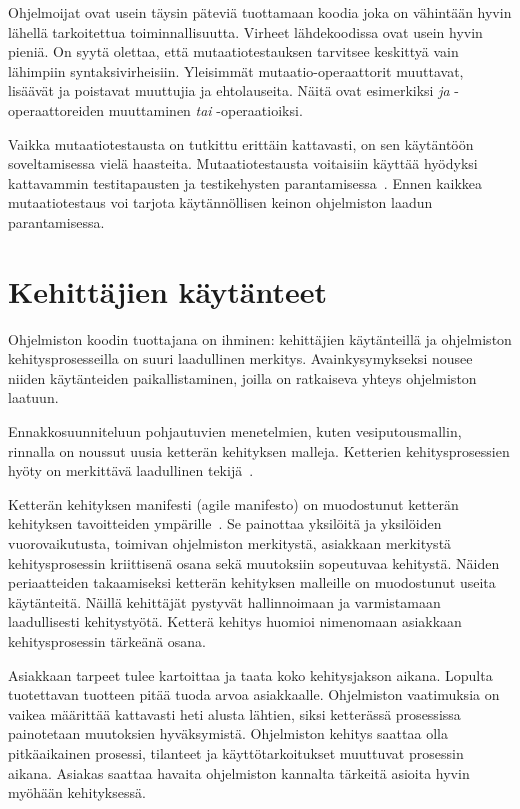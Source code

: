 \documentclass[finnish]{../tktltiki2}
\theoremstyle{definition}
\theoremstyle{remark}
\begin{document}
    Ohjelmoijat ovat usein täysin päteviä tuottamaan koodia joka on vähintään hyvin lähellä tarkoitettua 
toiminnallisuutta. Virheet lähdekoodissa ovat usein hyvin pieniä. On syytä olettaa, että mutaatiotestauksen tarvitsee 
keskittyä vain lähimpiin syntaksivirheisiin. Yleisimmät mutaatio-operaattorit muuttavat, lisäävät ja poistavat muuttujia 
ja ehtolauseita. Näitä ovat esimerkiksi \emph{ja} -operaattoreiden muuttaminen \emph{tai} -operaatioiksi.

Vaikka mutaatiotestausta on tutkittu erittäin kattavasti, on sen käytäntöön soveltamisessa vielä haasteita. 
Mutaatiotestausta voitaisiin käyttää hyödyksi kattavammin testitapausten ja testikehysten parantamisessa~\cite{YH11}. 
Ennen kaikkea mutaatiotestaus voi tarjota käytännöllisen keinon ohjelmiston laadun parantamisessa.

\section{Kehittäjien käytänteet}

Ohjelmiston koodin tuottajana on ihminen: kehittäjien käytänteillä ja ohjelmiston kehitysprosesseilla on suuri 
laadullinen merkitys. Avainkysymykseksi nousee niiden käytänteiden paikallistaminen, joilla on ratkaiseva yhteys 
ohjelmiston laatuun.

    Ennakkosuunniteluun pohjautuvien menetelmien, kuten vesiputousmallin, rinnalla on noussut uusia ketterän kehityksen 
malleja. Ketterien kehitysprosessien hyöty on merkittävä laadullinen tekijä~\cite{SS10}.

    Ketterän kehityksen manifesti (agile manifesto) on muodostunut ketterän kehityksen tavoitteiden 
ympärille~\cite{BBB01}. Se painottaa yksilöitä ja yksilöiden vuorovaikutusta, toimivan ohjelmiston merkitystä, asiakkaan 
merkitystä kehitysprosessin kriittisenä osana sekä muutoksiin sopeutuvaa kehitystä. Näiden periaatteiden takaamiseksi 
ketterän kehityksen malleille on muodostunut useita käytänteitä. Näillä kehittäjät pystyvät hallinnoimaan ja 
varmistamaan laadullisesti kehitystyötä. Ketterä kehitys huomioi nimenomaan asiakkaan kehitysprosessin tärkeänä osana.

    Asiakkaan tarpeet tulee kartoittaa ja taata koko kehitysjakson aikana. Lopulta tuotettavan tuotteen pitää tuoda 
arvoa asiakkaalle. Ohjelmiston vaatimuksia on vaikea määrittää kattavasti heti alusta lähtien, siksi ketterässä 
prosessissa painotetaan muutoksien hyväksymistä. Ohjelmiston kehitys saattaa olla pitkäaikainen prosessi, tilanteet ja 
käyttötarkoitukset muuttuvat prosessin aikana. Asiakas saattaa havaita ohjelmiston kannalta tärkeitä asioita hyvin 
myöhään kehityksessä.
\end{document}
